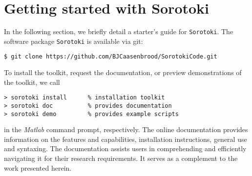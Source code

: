\section{Getting started with {Sorotoki}}
\label{sec:C5:open_softrobots}
In the following section, we briefly detail a starter's guide for \texttt{Sorotoki}. The software package \texttt{Sorotoki} is available via git:
%
\begin{lstlisting}[style=terminal]
$ git clone https://github.com/BJCaasenbrood/SorotokiCode.git
\end{lstlisting}
%
To install the toolkit, request the documentation, or preview demonstrations of the toolkit, we call 
%
\begin{lstlisting}[style=Matlabterminal]
> sorotoki install      % installation toolkit
> sorotoki doc          % provides documentation
> sorotoki demo         % provides example scripts
\end{lstlisting}
%
in the \textit{Matlab} command prompt, respectively. The online documentation provides information on the features and capabilities, installation instructions, general use and syntaxing. The documentation assists users in comprehending and efficiently navigating it for their research requirements. It serves as a complement to the work presented herein. 
